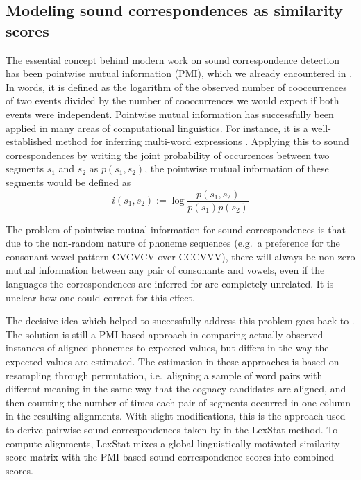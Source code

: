 \subsection{Modeling sound correspondences as similarity scores}
The essential concept behind modern work on sound correspondence detection has been pointwise mutual information (PMI), which we already encountered in . In words, it is defined as the logarithm of the observed number of cooccurrences of two events divided by the number of cooccurrences we would expect if both events were independent. Pointwise mutual information has successfully been applied in many areas of computational linguistics. For instance, it is a well-established method for inferring multi-word expressions \citep[e.g.][]{bouma2009}. Applying this to sound correspondences by writing the joint probability of occurrences between two segments $s_1$ and $s_2$ as $p(s_1,s_2)$, the pointwise mutual information of these segments would be defined as
\begin{equation*}
i(s_1,s_2) := \log \frac{p(s_1,s_2)}{p(s_1)p(s_2)}
\end{equation*}

The problem of pointwise mutual information for sound correspondences is that due to the non-random nature of phoneme sequences (e.g.\ a preference for the consonant-vowel pattern CVCVCV over CCCVVV), there will always be non-zero mutual information between any pair of consonants and vowels, even if the languages the correspondences are inferred for are completely unrelated. It is unclear how one could correct for this effect.

The decisive idea which helped to successfully address this problem goes back to \cite{kessler2001}. The solution is still a PMI-based approach in comparing actually observed instances of aligned phonemes to expected values, but differs in the way the expected values are estimated. The estimation in these approaches is based on resampling through permutation, i.e.\ aligning a sample of word pairs with different meaning in the same way that the cognacy candidates are aligned, and then counting the number of times each pair of segments occurred in one column in the resulting alignments. With slight modifications, this is the approach used to derive pairwise sound correspondences taken by \cite{list2012} in the LexStat method. To compute alignments, LexStat mixes a global linguistically motivated similarity score matrix with the PMI-based sound correspondence scores into combined scores.

